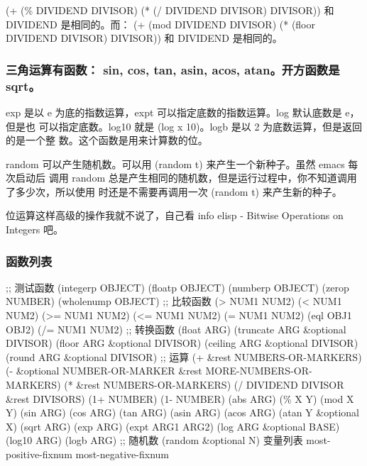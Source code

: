 \documentclass[11pt]{ctexart}
\begin{document}
(+ (\% DIVIDEND DIVISOR)
(* (/ DIVIDEND DIVISOR) DIVISOR))
和 DIVIDEND 是相同的。而：
(+ (mod DIVIDEND DIVISOR)
(* (floor DIVIDEND DIVISOR) DIVISOR))
和 DIVIDEND 是相同的。
\subsubsection{三角运算有函数： sin, cos, tan, asin, acos, atan。开方函数是 sqrt。}
\label{sec:org3dc3aaf}
exp 是以 e 为底的指数运算，expt 可以指定底数的指数运算。log 默认底数是 e，但是也
可以指定底数。log10 就是 (log x 10)。logb 是以 2 为底数运算，但是返回的是一个整
数。这个函数是用来计算数的位。

random 可以产生随机数。可以用 (random t) 来产生一个新种子。虽然 emacs 每次启动后
调用 random 总是产生相同的随机数，但是运行过程中，你不知道调用了多少次，所以使用
时还是不需要再调用一次 (random t) 来产生新的种子。

位运算这样高级的操作我就不说了，自己看 info elisp - Bitwise Operations on
Integers 吧。
\subsubsection{函数列表}
\label{sec:orgd19cc7a}
;; 测试函数
(integerp OBJECT)
(floatp OBJECT)
(numberp OBJECT)
(zerop NUMBER)
(wholenump OBJECT)
;; 比较函数
(> NUM1 NUM2)
(< NUM1 NUM2)
(>= NUM1 NUM2)
(<= NUM1 NUM2)
(= NUM1 NUM2)
(eql OBJ1 OBJ2)
(/= NUM1 NUM2)
;; 转换函数
(float ARG)
(truncate ARG \&optional DIVISOR)
(floor ARG \&optional DIVISOR)
(ceiling ARG \&optional DIVISOR)
(round ARG \&optional DIVISOR)
;; 运算
(+ \&rest NUMBERS-OR-MARKERS)
(- \&optional NUMBER-OR-MARKER \&rest MORE-NUMBERS-OR-MARKERS)
(* \&rest NUMBERS-OR-MARKERS)
(/ DIVIDEND DIVISOR \&rest DIVISORS)
(1+ NUMBER)
(1- NUMBER)
(abs ARG)
(\% X Y)
(mod X Y)
(sin ARG)
(cos ARG)
(tan ARG)
(asin ARG)
(acos ARG)
(atan Y \&optional X)
(sqrt ARG)
(exp ARG)
(expt ARG1 ARG2)
(log ARG \&optional BASE)
(log10 ARG)
(logb ARG)
;; 随机数
(random \&optional N)
变量列表
most-positive-fixnum
most-negative-fixnum
\end{document}
